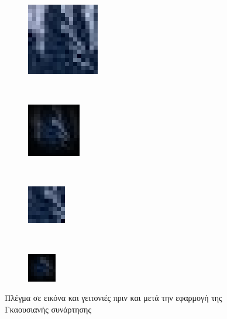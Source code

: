\begin{figure}
        \centering
        \begin{subfigure}[b]{0.2\textwidth}
                \centerline{\includegraphics[scale = 0.35]{./images/LFflow/croppedLarge_crop.png}}
                \caption{}\label{subfig:pregauss1}
        \end{subfigure}%
		~
        \centering
        \begin{subfigure}[b]{0.2\textwidth}
                \centerline{\includegraphics[scale = 0.45]{./images/LFflow/filteredLarge_crop.png}}
                \caption{}\label{subfig:gauss1}
        \end{subfigure}%
		~
        \centering
        \begin{subfigure}[b]{0.2\textwidth}
                \centerline{\includegraphics[scale = 0.45]{./images/LFflow/croppedSmall_crop.png}}
                \caption{}\label{subfig:pregauss2}
        \end{subfigure}%
		~
        \centering
        \begin{subfigure}[b]{0.2\textwidth}
                \centerline{\includegraphics[scale = 0.55]{./images/LFflow/filteredSmall_crop.png}}
                \caption{}\label{subfig:gauss2}
        \end{subfigure}%
        \caption{Πλέγμα σε εικόνα και γειτονιές πριν και μετά την εφαρμογή της Γκαουσιανής συνάρτησης}
        \label{fig:mountain}
\end{figure}





